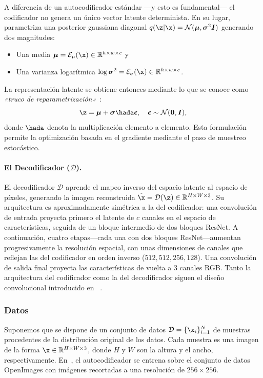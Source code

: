 \documentclass[../../book-main_es.tex]{subfiles}
\begin{document}
A diferencia de un autocodificador estándar ---y esto es fundamental--- el codificador no genera un único 
vector latente determinista. En su lugar, parametriza una posterior gaussiana diagonal 
$q(\z | \x) = \mathcal{N}(\boldsymbol{\mu}, \boldsymbol{\sigma}^2 \boldsymbol{I})$ generando dos magnitudes:
\begin{itemize}
    \item Una media $\boldsymbol{\mu} = \mathcal{E}_\mu(\x) \in \mathbb{R}^{h \times w \times c}$ y
    \item Una varianza logarítmica $\log \boldsymbol{\sigma}^2 = \mathcal{E}_\sigma(\x) \in \mathbb{R}^{h \times w \times c}$.
\end{itemize}
La representación latente se obtiene entonces mediante lo que se conoce como \emph{«truco de reparametrización»}~\citep{kingma2013auto}:
\begin{equation}
    \z = \boldsymbol{\mu} + \boldsymbol{\sigma} \hada \boldsymbol{\epsilon}, \quad \boldsymbol{\epsilon} \sim \mathcal{N}(\boldsymbol{0}, \boldsymbol{I}),
\end{equation}
donde $\hada$ denota la multiplicación elemento a elemento. Esta formulación permite la optimización 
basada en el gradiente mediante el paso de muestreo estocástico.

\paragraph{El Decodificador ($\mathcal{D}$).}
El decodificador $\mathcal{D}$ aprende el mapeo inverso del espacio latente al espacio 
de píxeles, generando la imagen reconstruida $\tilde{\x} = \mathcal{D}(\z) \in \mathbb{R}^{H \times W \times 3}$. 
Su arquitectura es aproximadamente simétrica a la del codificador: una convolución de entrada 
proyecta primero el latente de $c$ canales en el espacio de características, seguida de un bloque 
intermedio de dos bloques ResNet. A continuación, cuatro etapas---cada una con dos bloques ResNet---aumentan 
progresivamente la resolución espacial, con unas dimensiones de canales que reflejan las del codificador en 
orden inverso ($512, 512, 256, 128$). Una convolución de salida final proyecta las características de vuelta a 
3 canales RGB. Tanto la arquitectura del codificador como la del decodificador siguen el diseño convolucional 
introducido en ~\citep{esser2021taming}.

\subsubsection{Datos}
Suponemos que se dispone de un conjunto de datos $\mathcal{D} = \{\x_i\}_{i=1}^N$ de muestras procedentes 
de la distribución original de los datos. Cada muestra es una imagen de la forma $\x \in \mathbb{R}^{H \times W \times 3}$, 
donde $H$ y $W$ son la altura y el ancho, respectivamente. En~\citep{rombach2022high}, el autocodificador se 
entrena sobre el conjunto de datos OpenImages con imágenes recortadas a una resolución de $256 \times 256$.
\end{document}
